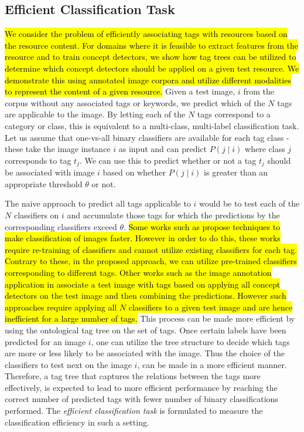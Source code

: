 \subsection{Efficient Classification Task}
\label{sec:effClassification}
\hl{We consider the problem of efficiently associating tags with resources based on the resource content. For domains where it is feasible to extract features from the resource and to train concept detectors, we show how tag trees can be utilized to determine which concept detectors should be applied on a given test resource. We demonstrate this using annotated image corpora and utilize different modalities to represent the content of a given resource. }
Given a test image, $i$ from the corpus without any associated tags or keywords, we predict which of the $N$ tags are applicable to the image. By letting each of the $N$ tags correspond to a category or class, this is equivalent to a multi-class, multi-label classification task. Let us assume that one-vs-all binary classifiers are available for each tag class - these take the image instance $i$ as input and can predict $P(j \mid i)$ where class $j$ corresponds to tag $t_j$. We can use this to predict whether or not a tag $t_j$ should be associated with image $i$ based on whether $P(j \mid i)$ is greater than an appropriate threshold $\theta$ or not. 

The naive approach to predict all tags applicable to $i$ would be to test each of the $N$ classifiers on $i$ and accumulate those tags for which the predictions by the corresponding classifiers exceed $\theta$. \hl{Some works such as {\cite{li2013classifying}} propose techniques to make classification of images faster. However in order to do this, these works require re-training of classifiers and cannot utilize existing classifiers for each tag. 
Contrary to these, in the proposed approach, we can utilize pre-trained classifiers corresponding to different tags. Other works such as the image annotation application in {\cite{wu2008flickr}} associate a test image with tags based on applying all concept detectors on the test image and then combining the predictions. However such approaches require applying all $N$ classifiers to a given test image and are hence inefficient for a large number of tags. }
This process can be made more efficient by using the ontological tag tree on the set of tags. Once certain labels have been predicted for an image $i$, one can utilize the tree structure to decide which tags are more or less likely to be associated with the image. Thus the choice of the classifiers to test next on the image $i$, can be made in a more efficient manner.  Therefore, a tag tree that captures the relations between the tags more effectively, is expected to lead to more efficient performance by reaching the correct number of predicted tags with fewer number of binary classifications performed. The \emph{efficient classification task} is formulated to measure the classification efficiency in such a setting. 

